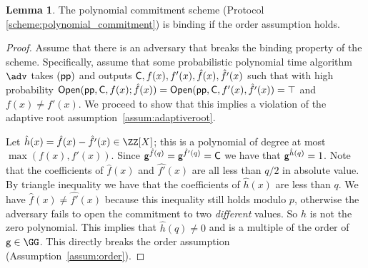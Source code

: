 \documentclass{article}
\theoremstyle{definition}
\newtheorem{lemma}{Lemma}
\newcommand{\alaninline}[1]{{\todo[color=blue!20!white, inline]{Alan: #1}}}
\newcommand{\alaninline}[1]{}
\begin{document}
\alaninline{Todo: correctness.}

\begin{lemma}
	The polynomial commitment scheme (Protocol \ref{scheme:polynomial_commitment}) is binding if the order assumption holds.
\end{lemma}
\begin{proof}
    Assume that there is an adversary that breaks the binding property of the scheme. Specifically, assume that some probabilistic polynomial time algorithm $\adv$ takes $(\textsf{pp})$ and outputs $\mathsf{C}, f(x), f'(x), \hat{f}(x), \hat{f'}(x)$ such that with high probability $\textsf{{Open}}(\textsf{pp}, \mathsf{C}, f(x); \hat{f}(x)) = \textsf{{Open}}(\textsf{pp}, \mathsf{C}, f'(x), \hat{f'}(x)) = \top$ and $f(x) \neq f'(x)$. We proceed to show that this implies a violation of the adaptive root assumption~\ref{assum:adaptiveroot}.
    
	Let $\hat{h}(x)=\hat{f}(x)-\hat{f'}(x) \in \ZZ[X]$; this is a polynomial of degree at most $\max(f(x), f'(x))$. Since $\mathsf{g}^{\hat{f}(q)}=\mathsf{g}^{\hat{f'}(q)}=\mathsf{C}$ we have that $\mathsf{g}^{\hat{h}(q)}=1$. Note that the coefficients of $\hat{f}(x)$ and $\hat{f'}(x)$ are all less than $q/2$ in absolute value. By triangle inequality we have that the coefficients of $\hat{h}(x)$ are less than $q$. We have $\hat{f}(x) \neq \hat{f'}(x)$ because this inequality still holds modulo $p$, otherwise the adversary fails to open the commitment to two \emph{different} values. So $\hat{h}$ is not the zero polynomial. This implies that $\hat{h}(q) \neq 0$ and is a multiple of the order of $\gr{g} \in \GG$. This directly breaks the order assumption (Assumption~\ref{assum:order}).
\end{proof}
\end{document}
